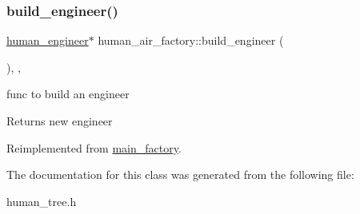 \subsubsection{\texorpdfstring{build\+\_\+engineer()}{build\_engineer()}}
{\footnotesize\ttfamily \mbox{\hyperlink{classhuman__engineer}{human\+\_\+engineer}}$\ast$ human\+\_\+air\+\_\+factory\+::build\+\_\+engineer (\begin{DoxyParamCaption}{ }\end{DoxyParamCaption})\hspace{0.3cm}{\ttfamily [inline]}, {\ttfamily [override]}, {\ttfamily [virtual]}}

func to build an engineer \begin{DoxyReturn}{Returns}
new engineer 
\end{DoxyReturn}


Reimplemented from \mbox{\hyperlink{classmain__factory_ac970fe346638331722123f2bb240b590}{main\+\_\+factory}}.



The documentation for this class was generated from the following file\+:\begin{DoxyCompactItemize}
\item 
human\+\_\+tree.\+h\end{DoxyCompactItemize}
